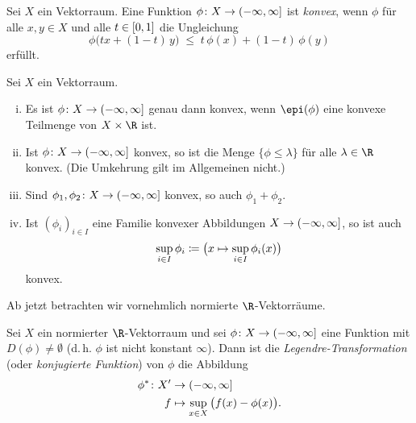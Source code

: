 \begin{thDef}
    Sei $X$ ein Vektorraum. Eine Funktion $\phi\colon X\to(-\infty,\infty]$ ist
    \emph{konvex}, wenn $\phi$ für alle $x,y\in X$ und alle $t\in[0,1]$ die
    Ungleichung
    \[ \phi\bigl( tx+(1-t)\,y \bigr) \;\leq\; t\,\phi(x) + (1-t)\,\phi(y)  \]
    erfüllt.
\end{thDef}

\begin{thLemma}
    Sei $X$ ein Vektorraum.
    \begin{enumerate}[i)]
        \item
            Es ist $\phi\colon X\to(-\infty,\infty]$ genau dann konvex, wenn
            $\epi(\phi)$ eine konvexe Teilmenge von $X\times\R$ ist.
        \item
            Ist $\phi\colon X\to(-\infty,\infty]$ konvex, so ist die Menge 
            $\{ \phi\leq\lambda \}$ für alle $\lambda\in\R$ konvex. 
            (Die Umkehrung gilt im Allgemeinen nicht.)
        \item
            Sind $\phi_1,\phi_2\colon X\to(-\infty,\infty]$ konvex, so auch
            $\phi_1+\phi_2$.
        \item
            Ist $(\phi_i)_{i\in I}$ eine Familie konvexer Abbildungen
            $X\to(-\infty,\infty]$, so ist auch 
            \[ \sup_{i\in I} \phi_i 
                \coloneqq \bigl(x\mapsto \sup_{i\in I} \phi_i(x)\bigr)
            \]
            konvex.
    \end{enumerate}
\end{thLemma}

Ab jetzt betrachten wir vornehmlich normierte $\R$-Vektorräume.

\begin{thDef}
    Sei $X$ ein normierter $\R$-Vektorraum und sei 
    $\phi\colon X\to(-\infty,\infty]$ eine Funktion mit $D(\phi)\neq\emptyset$
    (d.\,h. $\phi$ ist nicht konstant $\infty$).
    Dann ist die \emph{Legendre-Transformation} (oder \emph{konjugierte
    Funktion}) von $\phi$ die Abbildung
    \begin{align*}
        \phi^\ast\colon X' &\to (-\infty,\infty]    \\
        f &\mapsto \sup_{x\in X} \, \bigl( f(x) - \phi(x) \bigr)
    . \end{align*}
\end{thDef}

